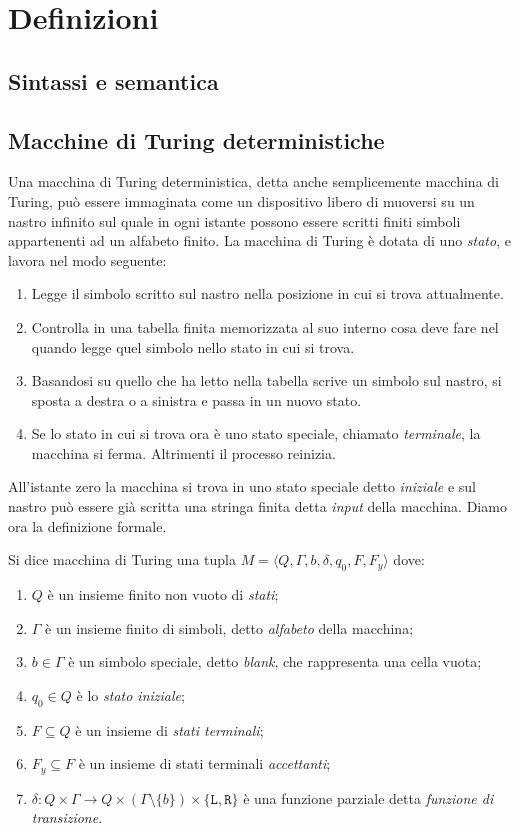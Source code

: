 \chapter{Definizioni}

\section{Sintassi e semantica}

\section{Macchine di Turing deterministiche}
\label{sec:det-TM}
Una macchina di Turing deterministica, detta anche semplicemente macchina di
Turing, può essere immaginata come un dispositivo libero di
muoversi su un nastro infinito sul quale in ogni istante possono essere scritti
finiti simboli appartenenti ad un alfabeto finito. La macchina di Turing è
dotata di uno \emph{stato}, e lavora nel modo seguente:
\begin{enumerate}
 \item Legge il simbolo scritto sul nastro nella posizione in cui si trova attualmente.
 \item Controlla in una tabella finita memorizzata al suo interno cosa deve fare
 nel quando legge quel simbolo nello stato in cui si trova.
 \item Basandosi su quello che ha letto nella tabella scrive un simbolo sul nastro,
 si sposta a destra o a sinistra e passa in un nuovo stato.
 \item Se lo stato in cui si trova ora è uno stato speciale, chiamato \emph{terminale},
 la macchina si ferma. Altrimenti il processo reinizia.
\end{enumerate}
All'istante zero la macchina si trova in uno stato speciale detto \emph{iniziale}
e sul nastro può essere già scritta una stringa finita detta \emph{input} della macchina.
Diamo ora la definizione formale.
\begin{definizione}
Si dice macchina di Turing una tupla
$M=\langle Q, \Gamma, b, \delta, q_0, F, F_y \rangle$ dove:
\begin{enumerate}
 \item $Q$ è un insieme finito non vuoto di \emph{stati};
 \item $\Gamma$ è un insieme finito di simboli, detto \emph{alfabeto} della macchina;
 \item $b \in \Gamma$ è un simbolo speciale, detto \emph{blank}, che rappresenta
 una cella vuota;
 \item $q_0 \in Q$ è lo \emph{stato iniziale};
 \item $F \subseteq Q$ è un insieme di \emph{stati terminali};
 \item $F_y \subseteq F$ è un insieme di stati terminali \emph{accettanti};
 \item $\delta: Q \times \Gamma \to Q \times (\Gamma \setminus \{b\}) \times \{\texttt{L},\texttt{R}\}$
 è una funzione parziale detta \emph{funzione di transizione}.
\end{enumerate}
\end{definizione}

